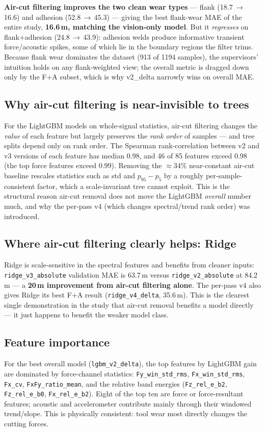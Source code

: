 \documentclass[11pt,a4paper]{article}
\newcommand{\code}[1]{\texttt{#1}}
\newcommand{\um}{\,\textmu m}
\begin{document}
\noindent
\textbf{Air-cut filtering improves the two clean wear types} --- flank
(18.7\,$\to$\,16.6) and adhesion (52.8\,$\to$\,45.3) --- giving the best
flank-wear MAE of the entire study, \textbf{16.6\um, matching the vision-only
model}. But it \emph{regresses} on flank+adhesion (24.8\,$\to$\,43.9): adhesion
welds produce informative transient force/acoustic spikes, some of which lie in
the boundary regions the filter trims. Because flank wear dominates the dataset
(913 of 1194 samples), the supervisors' intuition holds on any flank-weighted
view; the overall metric is dragged down only by the F+A subset, which is why
v2\_delta narrowly wins on overall MAE.

\subsection{Why air-cut filtering is near-invisible to trees}
\label{sec:treeinvar}
For the LightGBM models on whole-signal statistics, air-cut filtering changes
the \emph{value} of each feature but largely preserves the \emph{rank order} of
samples --- and tree splits depend only on rank order. The Spearman
rank-correlation between v2 and v3 versions of each feature has median 0.98, and
46 of 85 features exceed 0.98 (the top force features exceed 0.99). Removing the
$\approx$34\% near-constant air-cut baseline rescales statistics such as std and
$p_{95}-p_{5}$ by a roughly per-sample-consistent factor, which a scale-invariant
tree cannot exploit. This is the structural reason air-cut removal does not move
the LightGBM \emph{overall} number much, and why the per-pass v4 (which changes
spectral/trend rank order) was introduced.

\subsection{Where air-cut filtering clearly helps: Ridge}
Ridge is scale-sensitive in the spectral features and benefits from cleaner
inputs: \code{ridge\_v3\_absolute} validation MAE is 63.7\um{} versus
\code{ridge\_v2\_absolute} at 84.2\um{} --- a \textbf{20\um{} improvement from
air-cut filtering alone}. The per-pass v4 also gives Ridge its best F+A result
(\code{ridge\_v4\_delta}, 35.6\um). This is the clearest single demonstration in
the study that air-cut removal benefits a model directly --- it just happens to
benefit the weaker model class.

\subsection{Feature importance}
For the best overall model (\code{lgbm\_v2\_delta}), the top features by
LightGBM gain are dominated by force-channel statistics: \code{Fy\_win\_std\_rms},
\code{Fx\_win\_std\_rms}, \code{Fx\_cv}, \code{FxFy\_ratio\_mean}, and the
relative band energies (\code{Fz\_rel\_e\_b2}, \code{Fz\_rel\_e\_b0},
\code{Fx\_rel\_e\_b2}). Eight of the top ten are force or force-resultant
features; acoustic and accelerometer contribute mainly through their windowed
trend/slope. This is physically consistent: tool wear most directly changes the
cutting forces.
\end{document}
